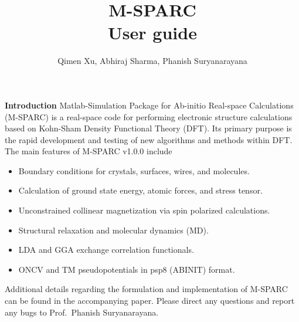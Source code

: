 \documentclass[xcolor=dvipsnames,t]{beamer}
\title[] {M-SPARC  \\ {\small User guide}}
\author{Qimen Xu, Abhiraj Sharma, Phanish Suryanarayana}
\institute[]
{
Material Physics \& Mechanics Group \\
Georgia Institute of Technology
}
\date{}
\let\otp\titlepage
\renewcommand{\titlepage}{\otp\addtocounter{framenumber}{-1}}
\begin{document}

\begin{frame}[plain]
 \titlepage
\end{frame}


\begin{frame}[allowframebreaks]{\textbf{Introduction}} \label{Introduction}
Matlab-Simulation Package for Ab-initio Real-space Calculations (M-SPARC) is a real-space code for performing electronic structure calculations based on Kohn-Sham Density Functional Theory (DFT). Its primary purpose is the rapid development and testing of new algorithms and methods within DFT. The main features of M-SPARC v1.0.0 include
\begin{itemize}
  \item Boundary conditions for crystals, surfaces, wires, and molecules. 
  \item Calculation of ground state energy, atomic forces, and stress tensor.
  \item Unconstrained collinear magnetization via spin polarized calculations.
  \item Structural relaxation and molecular dynamics (MD). 
  \item LDA and GGA exchange correlation functionals. 
  \item ONCV and TM pseudopotentials in psp8 (ABINIT) format. 
\end{itemize}
Additional details regarding the formulation and implementation of M-SPARC can be found in the accompanying paper. Please direct any questions and report any bugs to Prof.~Phanish Suryanarayana.

\end{frame}
\end{document}
